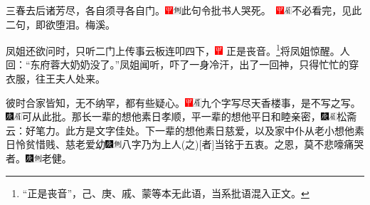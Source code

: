 三春去后诸芳尽，各自须寻各自门。{\includegraphics[width=3mm]{../Images/00002}\includegraphics[width=3mm]{../Images/00011}\footnotesize \kaishu 此句令批书人哭死。　\includegraphics[width=3mm]{../Images/00002}\includegraphics[width=3mm]{../Images/00010}\footnotesize \kaishu 不必看完，见此二句，即欲堕泪。梅溪。}

凤姐还欲问时，只听二门上传事云板连叩四下，{\includegraphics[width=3mm]{../Images/00002} \footnotesize \kaishu 正是丧音。}\footnote{“正是丧音”，己、庚、戚、蒙等本无此语，当系批语混入正文。}将凤姐惊醒。人回：“东府蓉大奶奶没了。”凤姐闻听，吓了一身冷汗，出了一回神，只得忙忙的穿衣服，往王夫人处来。

彼时合家皆知，无不纳罕，都有些疑心。{\includegraphics[width=3mm]{../Images/00002}\includegraphics[width=3mm]{../Images/00010}\footnotesize \kaishu 九个字写尽天香楼事，是不写之写。　\includegraphics[width=3mm]{../Images/00004}\includegraphics[width=3mm]{../Images/00010}\footnotesize \kaishu 可从此批。}那长一辈的想他素日孝顺，平一辈的想他平日和睦亲密，{\includegraphics[width=3mm]{../Images/00004}\includegraphics[width=3mm]{../Images/00010}\footnotesize \kaishu 松斋云：好笔力。此方是文字佳处。}下一辈的想他素日慈爱，以及家中仆从老小想他素日怜贫惜贱、慈老爱幼{{\includegraphics[width=3mm]{../Images/00004}\includegraphics[width=3mm]{../Images/00011}\footnotesize \kaishu 八字乃为上人{(之)}{[}者{]}当铭于五衷。}}之恩，莫不悲嚎痛哭者。{\includegraphics[width=3mm]{../Images/00004}\includegraphics[width=3mm]{../Images/00011}\footnotesize \kaishu 老健。}

